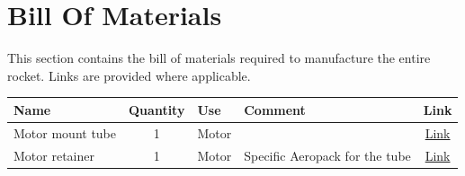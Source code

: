 \section{Bill Of Materials}

This section contains the bill of materials required to manufacture the entire
rocket. Links are provided where applicable.

\begin{table}
    \centering
    \begin{tabular}{| p{2in} | c | p{1in} | p{1in} | c |}
        \hline
        Name                       & Quantity & Use                     & Comment                                   & Link                                                                                                                                                                                                                                                                                                                                                                                                                                                                                                                                                                                                          \\
        \hline
        Motor mount tube           & 1        & Motor                   &                                           & \href{https://www.allrockets.ca/Build/Motor-Tubes/P/38}{Link}                                                                                                                                                                                                                                                                                                                                                                                                                                                                                                                                                 \\
        \hline
        Motor retainer             & 1        & Motor                   & Specific Aeropack for the tube            & \href{https://www.allrockets.ca/Build/Motor-Retainers/38-mm-P}{Link}                                                                                                                                                                                                                                                                                                                                                                                                                                                                                                                                          \\

\end{tabular}
\end{table}
